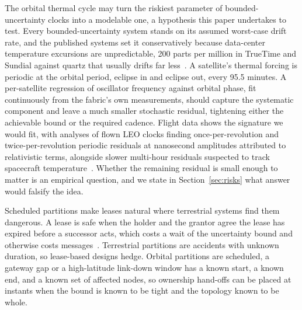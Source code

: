 \documentclass[twocolumn,10pt]{article}
\begin{document}
The orbital thermal cycle may turn the riskiest parameter of bounded-uncertainty clocks into a modelable one, a hypothesis this paper undertakes to test. Every bounded-uncertainty system stands on its assumed worst-case drift rate, and the published systems set it conservatively because data-center temperature excursions are unpredictable, 200 parts per million in TrueTime and Sundial against quartz that usually drifts far less~\cite{corbett2012,li2020}. A satellite's thermal forcing is periodic at the orbital period, eclipse in and eclipse out, every 95.5 minutes. A per-satellite regression of oscillator frequency against orbital phase, fit continuously from the fabric's own measurements, should capture the systematic component and leave a much smaller stochastic residual, tightening either the achievable bound or the required cadence. Flight data shows the signature we would fit, with analyses of flown LEO clocks finding once-per-revolution and twice-per-revolution periodic residuals at nanosecond amplitudes attributed to relativistic terms, alongside slower multi-hour residuals suspected to track spacecraft temperature~\cite{wang2022}. Whether the remaining residual is small enough to matter is an empirical question, and we state in Section~\ref{sec:risks} what answer would falsify the idea.

Scheduled partitions make leases natural where terrestrial systems find them dangerous. A lease is safe when the holder and the grantor agree the lease has expired before a successor acts, which costs a wait of the uncertainty bound and otherwise costs messages~\cite{liskov1991}. Terrestrial partitions are accidents with unknown duration, so lease-based designs hedge. Orbital partitions are scheduled, a gateway gap or a high-latitude link-down window has a known start, a known end, and a known set of affected nodes, so ownership hand-offs can be placed at instants when the bound is known to be tight and the topology known to be whole.
\end{document}
